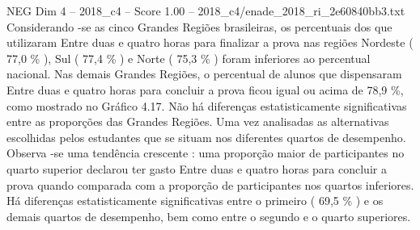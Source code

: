 \begin{textsample}{NEG Dim 4 – 2018\_c4 – Score 1.00 – 2018\_c4/enade\_2018\_ri\_2e60840bb3.txt}
Considerando -se as cinco Grandes Regiões brasileiras, os percentuais dos que utilizaram Entre duas e quatro horas para finalizar a prova nas regiões Nordeste ( 77,0 \% ), Sul ( 77,4 \% ) e Norte ( 75,3 \% ) foram inferiores ao percentual nacional.
Nas demais Grandes Regiões, o percentual de alunos que dispensaram Entre duas e quatro horas para concluir a prova ficou igual ou acima de 78,9 \%, como mostrado no Gráfico 4.17.
Não há diferenças estatisticamente significativas entre as proporções das Grandes Regiões.
Uma vez analisadas as alternativas escolhidas pelos estudantes que se situam nos diferentes quartos de desempenho.
Observa -se uma tendência crescente : uma proporção maior de participantes no quarto superior declarou ter gasto Entre duas e quatro horas para concluir a prova quando comparada com a proporção de participantes nos quartos inferiores.
Há diferenças estatisticamente significativas entre o primeiro ( 69,5 \% ) e os demais quartos de desempenho, bem como entre o segundo e o quarto superiores.

\end{textsample}
